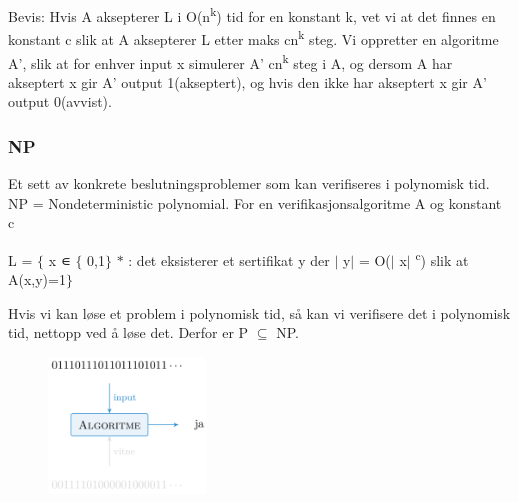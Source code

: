 \documentclass[12pt]{report}
\begin{document}

\par

Bevis: Hvis A aksepterer L i O(n\textsuperscript{k}) tid for en konstant k, vet vi at det finnes en konstant c slik at A aksepterer L etter maks cn\textsuperscript{k} steg. Vi oppretter en algoritme A’, slik at for enhver input x simulerer A’ cn\textsuperscript{k} steg i A, og dersom A har akseptert x gir A’ output 1(akseptert), og hvis den ikke har akseptert x gir A’ output 0(avvist). \par


\vspace{\baselineskip}
\subsubsection*{NP}
Et sett av konkrete beslutningsproblemer som kan verifiseres i polynomisk tid. NP = Nondeterministic polynomial. For en verifikasjonsalgoritme A og konstant c\par

\begin{Center}
L = $ \{ $ x ∊ $ \{ $ 0,1$ \} $ $\ast$  : det eksisterer et sertifikat y der $ \vert $ y$ \vert $  = O($ \vert $ x$ \vert $ \textsuperscript{c}) slik at A(x,y)=1$ \} $ 
\end{Center}\par

Hvis vi kan løse et problem i polynomisk tid, så kan vi verifisere det i polynomisk tid, nettopp ved å løse det. Derfor er P $ \subseteq $  NP. \par




\begin{figure}[H]
\advance\leftskip 5.15in		\includegraphics[width=1.65in,height=1.43in]{./media/image153.png}
\end{figure}


\end{document}
